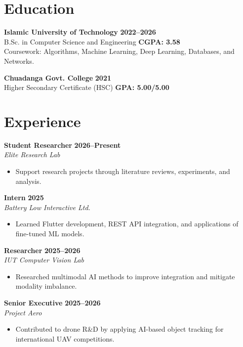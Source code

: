 \documentclass{resume}
\renewenvironment{rSection}[1]{
  \Needspace{3\baselineskip}%
  \section{#1}
  \begin{list}{}{
      \setlength{\leftmargin}{0.2em}
  }
  \item[]
}{
  \end{list}
  \vspace{0pt}
}
\begin{document}
\fontsize{11.5pt}{14pt}\selectfont


\begin{rSection}{Education}
\textbf{Islamic University of Technology} \hfill \textbf{2022--2026} \\
B.Sc. in Computer Science and Engineering \hfill \textbf{CGPA: 3.58} \\
Coursework: Algorithms, Machine Learning, Deep Learning, Databases, and Networks.

\textbf{Chuadanga Govt. College} \hfill \textbf{2021} \\
Higher Secondary Certificate (HSC) \hfill \textbf{GPA: 5.00/5.00}
\end{rSection}

\begin{rSection}{Experience}
\textbf{Student Researcher} \hfill \textbf{2026--Present} \\
\emph{Elite Research Lab}
\begin{itemize}
  \item Support research projects through literature reviews, experiments, and analysis.
\end{itemize}

\textbf{Intern} \hfill \textbf{2025} \\
\emph{Battery Low Interactive Ltd.}
\begin{itemize}
  \item Learned Flutter development, REST API integration, and applications of fine-tuned ML models.
\end{itemize}

\textbf{Researcher} \hfill \textbf{2025--2026} \\
\emph{IUT Computer Vision Lab}
\begin{itemize}
  \item Researched multimodal AI methods to improve integration and mitigate modality imbalance.
\end{itemize}


\textbf{Senior Executive} \hfill \textbf{2025--2026} \\
\emph{Project Aero}
\begin{itemize}
  \item Contributed to drone R\&D by applying AI-based object tracking for international UAV competitions.
\end{itemize}



\end{rSection}
\end{document}
